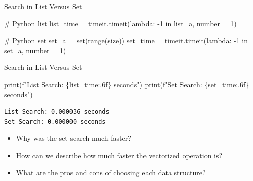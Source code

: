 \documentclass[
  ignorenonframetext,
]{beamer}
\newenvironment{Shaded}{\begin{snugshade}}{\end{snugshade}}
\newcommand{\BuiltInTok}[1]{\textcolor[rgb]{0.00,0.23,0.31}{#1}}
\newcommand{\CommentTok}[1]{\textcolor[rgb]{0.37,0.37,0.37}{#1}}
\newcommand{\DecValTok}[1]{\textcolor[rgb]{0.68,0.00,0.00}{#1}}
\newcommand{\KeywordTok}[1]{\textcolor[rgb]{0.00,0.23,0.31}{#1}}
\newcommand{\NormalTok}[1]{\textcolor[rgb]{0.00,0.23,0.31}{#1}}
\newcommand{\OperatorTok}[1]{\textcolor[rgb]{0.37,0.37,0.37}{#1}}
\newcommand{\SpecialCharTok}[1]{\textcolor[rgb]{0.37,0.37,0.37}{#1}}
\newcommand{\SpecialStringTok}[1]{\textcolor[rgb]{0.13,0.47,0.30}{#1}}
\begin{document}
\begin{frame}[fragile]{Search in List Versus Set}
\protect\hypertarget{search-in-list-versus-set}{}
\begin{Shaded}
\begin{Highlighting}[]
\CommentTok{\# Python list}
\NormalTok{list\_time }\OperatorTok{=}\NormalTok{ timeit.timeit(}\KeywordTok{lambda}\NormalTok{:}
  \OperatorTok{{-}}\DecValTok{1} \KeywordTok{in}\NormalTok{ list\_a, number }\OperatorTok{=} \DecValTok{1}\NormalTok{)}
  
\CommentTok{\# Python set}
\NormalTok{set\_a }\OperatorTok{=} \BuiltInTok{set}\NormalTok{(}\BuiltInTok{range}\NormalTok{(size))}
\NormalTok{set\_time }\OperatorTok{=}\NormalTok{ timeit.timeit(}\KeywordTok{lambda}\NormalTok{:}
  \OperatorTok{{-}}\DecValTok{1} \KeywordTok{in}\NormalTok{ set\_a, number }\OperatorTok{=} \DecValTok{1}\NormalTok{)}
\end{Highlighting}
\end{Shaded}
\end{frame}

\begin{frame}[fragile]{Search in List Versus Set}
\protect\hypertarget{search-in-list-versus-set-1}{}
\begin{Shaded}
\begin{Highlighting}[]
\BuiltInTok{print}\NormalTok{(}\SpecialStringTok{f"List Search: }\SpecialCharTok{\{}\NormalTok{list\_time}\SpecialCharTok{:.6f\}}\SpecialStringTok{ seconds"}\NormalTok{)}
\BuiltInTok{print}\NormalTok{(}\SpecialStringTok{f"Set Search: }\SpecialCharTok{\{}\NormalTok{set\_time}\SpecialCharTok{:.6f\}}\SpecialStringTok{ seconds"}\NormalTok{)}
\end{Highlighting}
\end{Shaded}

\begin{verbatim}
List Search: 0.000036 seconds
Set Search: 0.000000 seconds
\end{verbatim}

\begin{itemize}
\item
  Why was the set search much faster?
\item
  How can we describe how much faster the vectorized operation is?
\item
  What are the pros and cons of choosing each data structure?
\end{itemize}
\end{frame}
\end{document}

